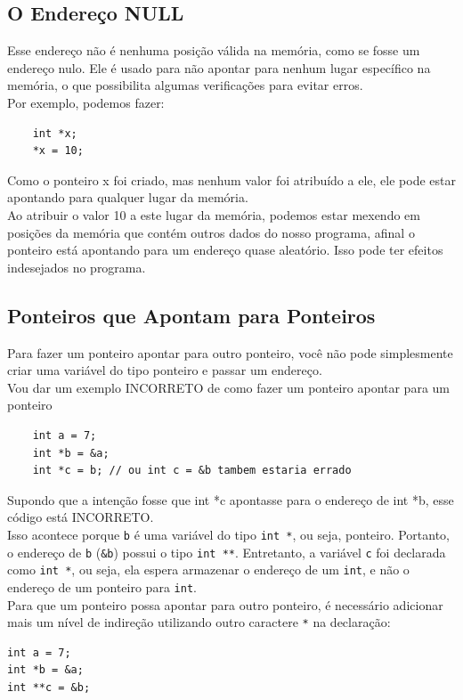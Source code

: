\documentclass{article}
\begin{document}
\subsection{O Endereço NULL}
Esse endereço não é nenhuma posição válida na memória, como se fosse um endereço nulo. Ele é usado para não apontar para nenhum lugar específico na memória, o que possibilita algumas verificações para evitar erros.
\\[3pt]
Por exemplo, podemos fazer:
\begin{lstlisting}
    int *x;
    *x = 10;
\end{lstlisting}
Como o ponteiro x foi criado, mas nenhum valor foi atribuído a ele, ele pode estar apontando para qualquer lugar da memória.
\\[3pt]
Ao atribuir o valor 10 a este lugar da memória, podemos estar mexendo em posições da memória que contém outros dados do nosso programa, afinal o ponteiro está apontando para um endereço quase aleatório. Isso pode ter efeitos indesejados no programa.

\subsection{Ponteiros que Apontam para Ponteiros}
Para fazer um ponteiro apontar para outro ponteiro, você não pode simplesmente criar uma variável do tipo ponteiro e passar um endereço.
\\[2pt]
Vou dar um exemplo INCORRETO de como fazer um ponteiro apontar para um ponteiro
\begin{lstlisting}
    int a = 7;
    int *b = &a;
    int *c = b; // ou int c = &b tambem estaria errado
\end{lstlisting}
Supondo que a intenção fosse que int *c apontasse para o endereço de int *b, esse código está INCORRETO.
\\[2pt]
Isso acontece porque \texttt{b} é uma variável do tipo \texttt{int *}, ou seja, ponteiro. Portanto, o endereço de \texttt{b} (\texttt{\&b}) possui o tipo \texttt{int **}. Entretanto, a variável \texttt{c} foi declarada como \texttt{int *}, ou seja, ela espera armazenar o endereço de um \texttt{int}, e não o endereço de um ponteiro para \texttt{int}.
\\[2pt]
Para que um ponteiro possa apontar para outro ponteiro, é necessário adicionar mais um nível de indireção utilizando outro caractere \texttt{*} na declaração:
\begin{lstlisting}
int a = 7;
int *b = &a;
int **c = &b;
\end{lstlisting}
\end{document}

